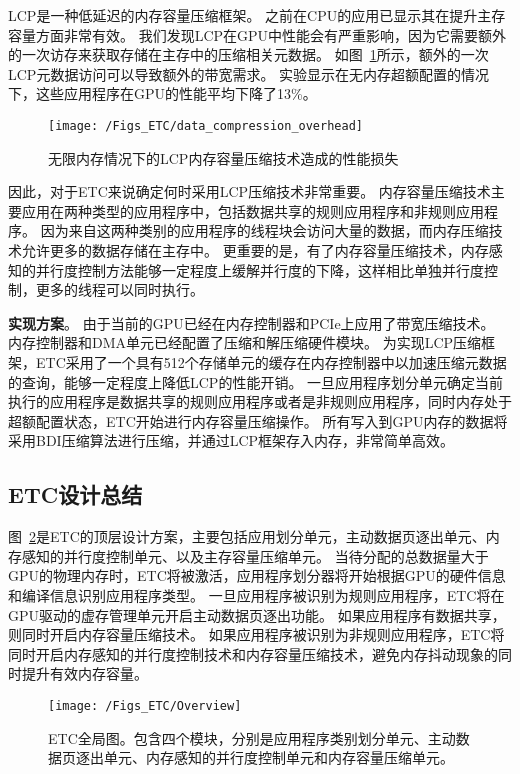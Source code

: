 LCP是一种低延迟的内存容量压缩框架。
之前在CPU的应用已显示其在提升主存容量方面非常有效。
我们发现LCP在GPU中性能会有严重影响，因为它需要额外的一次访存来获取存储在主存中的压缩相关元数据。
如图~\ref{fig:data_compression_overhead}所示，额外的一次LCP元数据访问可以导致额外的带宽需求。
实验显示在无内存超额配置的情况下，这些应用程序在GPU的性能平均下降了13\%。




\begin{figure}[htbp] %
  \centering
  \texttt{[image: /Figs\_ETC/data\_compression\_overhead]}
  \caption{无限内存情况下的LCP内存容量压缩技术造成的性能损失}
  \label{fig:data_compression_overhead}
\end{figure}

因此，对于ETC来说确定何时采用LCP压缩技术非常重要。
内存容量压缩技术主要应用在两种类型的应用程序中，包括数据共享的规则应用程序和非规则应用程序。
因为来自这两种类别的应用程序的线程块会访问大量的数据，而内存压缩技术允许更多的数据存储在主存中。
更重要的是，有了内存容量压缩技术，内存感知的并行度控制方法能够一定程度上缓解并行度的下降，这样相比单独并行度控制，更多的线程可以同时执行。

\textbf{实现方案}。
由于当前的GPU已经在内存控制器和PCIe上应用了带宽压缩技术。
内存控制器和DMA单元已经配置了压缩和解压缩硬件模块。
为实现LCP压缩框架，ETC采用了一个具有512个存储单元的缓存在内存控制器中以加速压缩元数据的查询，能够一定程度上降低LCP的性能开销。
一旦应用程序划分单元确定当前执行的应用程序是数据共享的规则应用程序或者是非规则应用程序，同时内存处于超额配置状态，ETC开始进行内存容量压缩操作。
所有写入到GPU内存的数据将采用BDI压缩算法进行压缩，并通过LCP框架存入内存，非常简单高效。

\subsection{ETC设计总结}
图~\ref{fig:Overview}是ETC的顶层设计方案，主要包括应用划分单元，主动数据页逐出单元、内存感知的并行度控制单元、以及主存容量压缩单元。
当待分配的总数据量大于GPU的物理内存时，ETC将被激活，应用程序划分器将开始根据GPU的硬件信息和编译信息识别应用程序类型。
一旦应用程序被识别为规则应用程序，ETC将在GPU驱动的虚存管理单元开启主动数据页逐出功能。
如果应用程序有数据共享，则同时开启内存容量压缩技术。
如果应用程序被识别为非规则应用程序，ETC将同时开启内存感知的并行度控制技术和内存容量压缩技术，避免内存抖动现象的同时提升有效内存容量。

\begin{figure}[htbp] %
  \centering
  \texttt{[image: /Figs\_ETC/Overview]}
  \caption{ETC全局图。包含四个模块，分别是应用程序类别划分单元、主动数据页逐出单元、内存感知的并行度控制单元和内存容量压缩单元。}
  \label{fig:Overview}
\end{figure}


